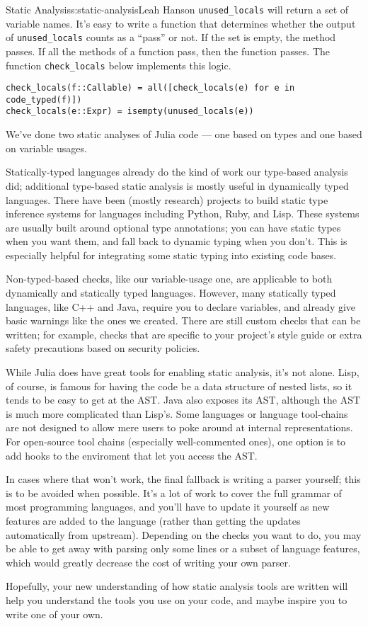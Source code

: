 \begin{aosachapter}{Static Analysis}{s:static-analysis}{Leah Hanson}
\texttt{unused\_locals} will return a set of variable names. It's easy
to write a function that determines whether the output of
\texttt{unused\_locals} counts as a ``pass'' or not. If the set is
empty, the method passes. If all the methods of a function pass, then
the function passes. The function \texttt{check\_locals} below
implements this logic.

\begin{verbatim}
check_locals(f::Callable) = all([check_locals(e) for e in code_typed(f)])
check_locals(e::Expr) = isempty(unused_locals(e))
\end{verbatim}

\label{conclusion}

We've done two static analyses of Julia code --- one based on types and
one based on variable usages.

Statically-typed languages already do the kind of work our type-based
analysis did; additional type-based static analysis is mostly useful in
dynamically typed languages. There have been (mostly research) projects
to build static type inference systems for languages including Python,
Ruby, and Lisp. These systems are usually built around optional type
annotations; you can have static types when you want them, and fall back
to dynamic typing when you don't. This is especially helpful for
integrating some static typing into existing code bases.

Non-typed-based checks, like our variable-usage one, are applicable to
both dynamically and statically typed languages. However, many
statically typed languages, like C++ and Java, require you to declare
variables, and already give basic warnings like the ones we created.
There are still custom checks that can be written; for example, checks
that are specific to your project's style guide or extra safety
precautions based on security policies.

While Julia does have great tools for enabling static analysis, it's not
alone. Lisp, of course, is famous for having the code be a data
structure of nested lists, so it tends to be easy to get at the AST.
Java also exposes its AST, although the AST is much more complicated
than Lisp's. Some languages or language tool-chains are not designed to
allow mere users to poke around at internal representations. For
open-source tool chains (especially well-commented ones), one option is
to add hooks to the enviroment that let you access the AST.

In cases where that won't work, the final fallback is writing a parser
yourself; this is to be avoided when possible. It's a lot of work to
cover the full grammar of most programming languages, and you'll have to
update it yourself as new features are added to the language (rather
than getting the updates automatically from upstream). Depending on the
checks you want to do, you may be able to get away with parsing only
some lines or a subset of language features, which would greatly
decrease the cost of writing your own parser.

Hopefully, your new understanding of how static analysis tools are
written will help you understand the tools you use on your code, and
maybe inspire you to write one of your own.

\end{aosachapter}
